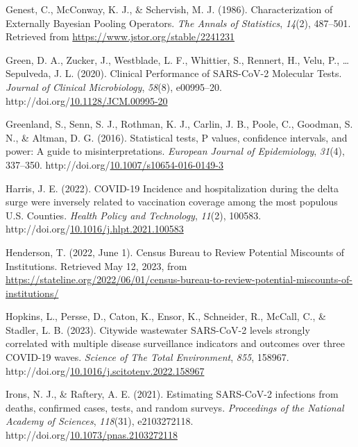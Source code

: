 \documentclass[12pt,twoside]{smiththesis}
\newlength{\cslhangindent}
\newenvironment{CSLReferences}[2] %
 {%
\setlength{\parindent}{0pt}
\ifodd #1 \everypar{\setlength{\hangindent}{\cslhangindent}}\ignorespaces\fi
\ifnum #2 > 0
\setlength{\parskip}{#2\baselineskip}
  \fi
}%
{}
\begin{document}
\begin{CSLReferences}{1}{0}
\leavevmode{}%
Genest, C., McConway, K. J., \& Schervish, M. J. (1986). Characterization of {Externally Bayesian Pooling Operators}. \emph{The Annals of Statistics}, \emph{14}(2), 487--501. Retrieved from \url{https://www.jstor.org/stable/2241231}

\leavevmode{}%
Green, D. A., Zucker, J., Westblade, L. F., Whittier, S., Rennert, H., Velu, P., \ldots{} Sepulveda, J. L. (2020). Clinical {Performance} of {SARS-CoV-2 Molecular Tests}. \emph{Journal of Clinical Microbiology}, \emph{58}(8), e00995--20. http://doi.org/\href{https://doi.org/10.1128/JCM.00995-20}{10.1128/JCM.00995-20}

\leavevmode{}%
Greenland, S., Senn, S. J., Rothman, K. J., Carlin, J. B., Poole, C., Goodman, S. N., \& Altman, D. G. (2016). Statistical tests, {P} values, confidence intervals, and power: A guide to misinterpretations. \emph{European Journal of Epidemiology}, \emph{31}(4), 337--350. http://doi.org/\href{https://doi.org/10.1007/s10654-016-0149-3}{10.1007/s10654-016-0149-3}

\leavevmode{}%
Harris, J. E. (2022). {COVID-19 Incidence} and hospitalization during the delta surge were inversely related to vaccination coverage among the most populous {U}.{S}. {Counties}. \emph{Health Policy and Technology}, \emph{11}(2), 100583. http://doi.org/\href{https://doi.org/10.1016/j.hlpt.2021.100583}{10.1016/j.hlpt.2021.100583}

\leavevmode{}%
Henderson, T. (2022, June 1). Census {Bureau} to {Review Potential Miscounts} of {Institutions}. Retrieved May 12, 2023, from \url{https://stateline.org/2022/06/01/census-bureau-to-review-potential-miscounts-of-institutions/}

\leavevmode{}%
Hopkins, L., Persse, D., Caton, K., Ensor, K., Schneider, R., McCall, C., \& Stadler, L. B. (2023). Citywide wastewater {SARS-CoV-2} levels strongly correlated with multiple disease surveillance indicators and outcomes over three {COVID-19} waves. \emph{Science of The Total Environment}, \emph{855}, 158967. http://doi.org/\href{https://doi.org/10.1016/j.scitotenv.2022.158967}{10.1016/j.scitotenv.2022.158967}

\leavevmode{}%
Irons, N. J., \& Raftery, A. E. (2021). Estimating {SARS-CoV-2} infections from deaths, confirmed cases, tests, and random surveys. \emph{Proceedings of the National Academy of Sciences}, \emph{118}(31), e2103272118. http://doi.org/\href{https://doi.org/10.1073/pnas.2103272118}{10.1073/pnas.2103272118}


\end{CSLReferences}
\end{document}
